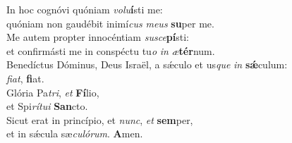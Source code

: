 \evenverse In hoc cognóvi quóniam \textit{vo}\textit{lu}\textbf{í}sti me:~\*\\
\evenverse quóniam non gaudébit inimí\textit{cus} \textit{me}\textit{us} \textbf{su}per me.\\
\oddverse Me autem propter innocéntiam \textit{su}\textit{sce}\textbf{pí}sti:~\*\\
\oddverse et confirmásti me in conspéctu tu\textit{o} \textit{in} \textit{æ}\textbf{tér}num.\\
\evenverse Benedíctus Dóminus, Deus Israël, a sǽculo et us\textit{que} \textit{in} \textbf{sǽ}culum:~\*\\
\evenverse \textit{fi}\textit{at}, \textbf{fi}at.\\
\oddverse Glória Pa\textit{tri}, \textit{et} \textbf{Fí}lio,~\*\\
\oddverse et Spi\textit{rí}\textit{tu}\textit{i} \textbf{San}cto.\\
\evenverse Sicut erat in princípio, et \textit{nunc}, \textit{et} \textbf{sem}per,~\*\\
\evenverse et in sǽcula sæ\textit{cu}\textit{ló}\textit{rum}. \textbf{A}men.\\
